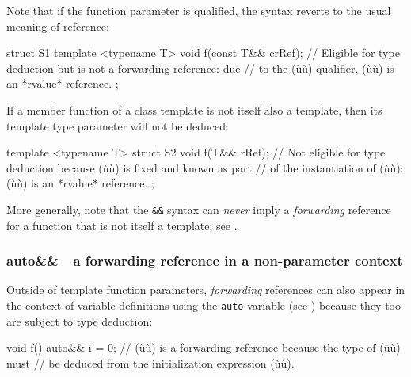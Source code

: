 \noindent Note that if the function parameter is qualified, the syntax reverts to
the usual meaning of  reference:

\begin{emcppslisting}
struct S1
{
    template <typename T>
    void f(const T&& crRef);
        // Eligible for type deduction but is not a forwarding reference: due
        // to the (ù{}ù) qualifier, (ù{}ù) is an *rvalue* reference.
};
\end{emcppslisting}

\noindent If a member function of a class template is not itself also a template,
then its template type parameter will not be deduced:

\begin{emcppslisting}
template <typename T>
struct S2
{
    void f(T&& rRef);
       // Not eligible for type deduction because (ù{}ù) is fixed and known as part
       // of the instantiation of (ù{}ù): (ù{}ù) is an *rvalue* reference.
};
\end{emcppslisting}

\noindent More generally, note that the \lstinline!&&! syntax can \emph{never}
imply a \emph{forwarding} reference for a function that is not itself a
template; see .

\subsubsection[\lstinline!auto&&! --- a forwarding reference in a non-parameter context]{{\SubsubsecCode auto\&\&}~{\subsubemdash}~a forwarding reference in a non-parameter context}\label{auto-a-forwarding-reference-in-a-non-parameter-context}

Outside of template function parameters, \emph{forwarding} references
can also appear in the context of variable definitions using the
\lstinline!auto! variable (see ) 
because they too are subject to type
deduction:

\begin{emcppslisting}
void f()
{
    auto&& i = 0;  // (ù{}ù) is a forwarding reference because the type of (ù{}ù) must
                   // be deduced from the initialization expression (ù{}ù).
}
\end{emcppslisting}

